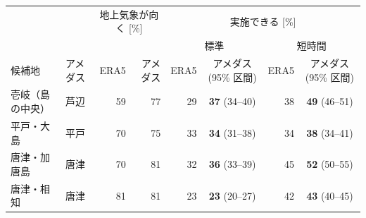 \begin{tabular}{llrrrcrc}
\toprule
& & \multicolumn{2}{c}{地上気象が向く [\%]} & \multicolumn{4}{c}{実施できる [\%]} \\
& & & & \multicolumn{2}{c}{標準} & \multicolumn{2}{c}{短時間} \\
候補地 & アメダス & ERA5 & アメダス & ERA5 & アメダス (95\% 区間) & ERA5 & アメダス (95\% 区間) \\
\midrule
壱岐（島の中央） & 芦辺 & 59 & 77 & 29 & \textbf{37} (34--40) & 38 & \textbf{49} (46--51) \\
平戸・大島 & 平戸 & 70 & 75 & 33 & \textbf{34} (31--38) & 34 & \textbf{38} (34--41) \\
唐津・加唐島 & 唐津 & 70 & 81 & 32 & \textbf{36} (33--39) & 45 & \textbf{52} (50--55) \\
唐津・相知 & 唐津 & 81 & 81 & 23 & \textbf{23} (20--27) & 42 & \textbf{43} (40--45) \\
\bottomrule
\end{tabular}
